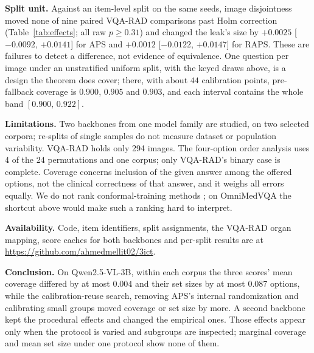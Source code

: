 \documentclass[a4paper,conference]{IEEEtran}
\newcommand{\rtag}[1]{}
\begin{document}
\textbf{Split unit.} Against an item-level split on the same seeds, image
disjointness moved none of nine paired VQA-RAD comparisons past Holm
correction (Table~\ref{tab:effects}; all raw $p\ge0.31$) and changed the
leak's size by $+0.0025$ [$-0.0092$, $+0.0141$] for APS and $+0.0012$
[$-0.0122$, $+0.0147$] for RAPS. These are failures to detect a difference,
not evidence of equivalence.\rtag{R1.5} One question per image under an unstratified
uniform split, with the keyed draws above, is a design the theorem does cover;
there, with about $44$ calibration points, pre-fallback coverage is $0.900$,
$0.905$ and $0.903$, and each interval contains the whole band
$[0.900,\,0.922]$.

\textbf{Limitations.} Two backbones from one model family are studied, on two
selected corpora; re-splits of single samples do not measure dataset or
population variability. VQA-RAD holds only 294 images. The four-option order
analysis uses 4 of the 24 permutations and one corpus; only VQA-RAD's binary
case is complete.\rtag{R1.3} Coverage concerns inclusion of the given answer among the
offered options, not the clinical correctness of that answer, and it weighs all
errors equally. We do not rank conformal-training methods
\cite{stutz2022learning,einbinder2022training,shi2025dpsm}; on OmniMedVQA the
shortcut above would make such a ranking hard to interpret.

\textbf{Availability.} Code, item identifiers, split assignments, the VQA-RAD
organ mapping, score caches for both backbones and per-split results are at
\url{https://github.com/ahmedmellit02/3ict}.\rtag{R2.2}

\textbf{Conclusion.} On Qwen2.5-VL-3B, within each corpus the three scores'
mean coverage differed by at most $0.004$ and their set sizes by at most
$0.087$ options, while the calibration-reuse search, removing APS's internal
randomization and calibrating small groups moved coverage or set size by more.
A second backbone kept the procedural effects and changed the empirical ones.
Those effects appear only when the protocol is varied and subgroups are
inspected; marginal coverage and mean set size under one protocol show none of
them.



\end{document}
